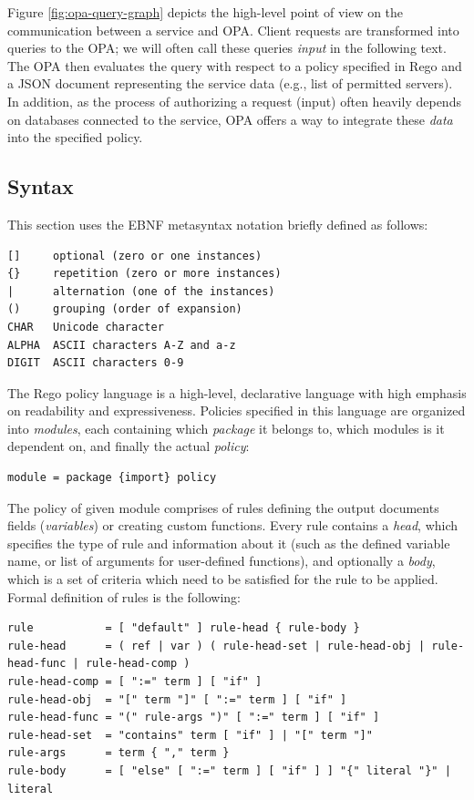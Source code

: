 Figure \ref{fig:opa-query-graph} depicts the high-level point of view on the communication between a service and OPA.
Client requests are transformed into queries to the OPA; we will often call these queries \emph{input} in the following text.
The OPA then evaluates the query with respect to a policy specified in Rego and a JSON document representing the service data (e.g., list of permitted servers).
In addition, as the process of authorizing a request (input) often heavily depends on databases connected to the service, OPA offers a way to integrate these \emph{data} into the specified policy.

\subsection{Syntax}

This section uses the EBNF metasyntax notation \cite{EBNF:web} briefly defined as follows:
\begin{lstlisting}
[]     optional (zero or one instances)
{}     repetition (zero or more instances)
|      alternation (one of the instances)
()     grouping (order of expansion)
CHAR   Unicode character
ALPHA  ASCII characters A-Z and a-z
DIGIT  ASCII characters 0-9
\end{lstlisting}

The Rego policy language is a high-level, declarative language with high emphasis on readability and expressiveness.
Policies specified in this language are organized into \emph{modules}, each containing which \emph{package} it belongs to, which modules is it dependent on, and finally the actual \emph{policy}:
\begin{lstlisting}
module = package {import} policy
\end{lstlisting}

The policy of given module comprises of rules defining the output documents fields (\emph{variables}) or creating custom functions.
Every rule contains a \emph{head}, which specifies the type of rule and information about it (such as the defined variable name, or list of arguments for user-defined functions), and optionally a \emph{body}, which is a set of criteria which need to be satisfied for the rule to be applied.
Formal definition of rules is the following:
\begin{lstlisting}
rule           = [ "default" ] rule-head { rule-body }
rule-head      = ( ref | var ) ( rule-head-set | rule-head-obj | rule-head-func | rule-head-comp )
rule-head-comp = [ ":=" term ] [ "if" ]
rule-head-obj  = "[" term "]" [ ":=" term ] [ "if" ]
rule-head-func = "(" rule-args ")" [ ":=" term ] [ "if" ]
rule-head-set  = "contains" term [ "if" ] | "[" term "]"
rule-args      = term { "," term }
rule-body      = [ "else" [ ":=" term ] [ "if" ] ] "{" literal "}" | literal
\end{lstlisting}

